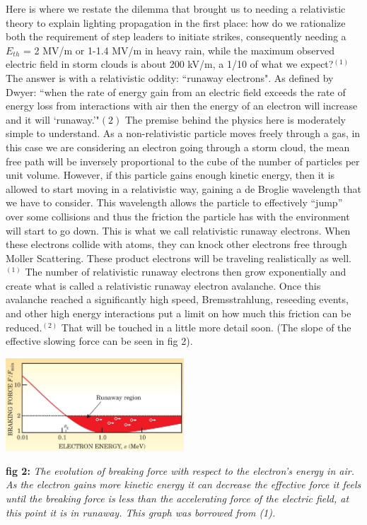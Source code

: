 \documentclass[11pt]{article}
\begin{document}
    Here is where we restate the dilemma that brought us to needing a relativistic theory to explain lighting propagation in the first place: how do we rationalize both the requirement of step leaders to initiate strikes, consequently needing a $E_{th}$ = 2 MV/m or 1-1.4 MV/m in heavy rain, while the maximum observed electric field in storm clouds is about 200 kV/m, a 1/10 of what we expect?$^{(1)}$ The answer is with a relativistic oddity: ``runaway electrons". As defined by Dwyer: ``when the rate of energy gain from an electric field exceeds the rate of energy loss from interactions with air then the energy of an electron will increase and it will `runaway.'"${(2)}$ The premise behind the physics here is moderately simple to understand. As a non-relativistic particle moves freely through a gas, in this case we are considering an electron going through a storm cloud, the mean free path will be inversely proportional to the cube of the number of particles per unit volume. However, if this particle gains enough kinetic energy, then it is allowed to start moving in a relativistic way, gaining a de Broglie wavelength that we have to consider. This wavelength allows the particle to effectively “jump” over some collisions and thus the friction the particle has with the environment will start to go down. This is what we call relativistic runaway electrons. When these electrons collide with atoms, they can knock other electrons free through Moller Scattering. These product electrons will be traveling realistically as well.$^{(1)}$ The number of relativistic runaway electrons then grow exponentially and create what is called a relativistic runaway electron avalanche. Once this avalanche reached a significantly high speed, Bremsstrahlung, reseeding events, and other high energy interactions put a limit on how much this friction can be reduced.$^{(2)}$ That will be touched in a little more detail soon. (The slope of the effective slowing force can be seen in fig 2).
    
    \noindent
    \begin{center}
        \includegraphics[width=0.5\textwidth]{images/Breaking Plot.JPG}
    \end{center}
    \textbf{fig 2:} \textit{The evolution of breaking force with respect to the electron's energy in air. As the electron gains more kinetic energy it can decrease the effective force it feels until the breaking force is less than the accelerating force of the electric field, at this point it is in runaway. This graph was borrowed from (1).}
    
\end{document}

